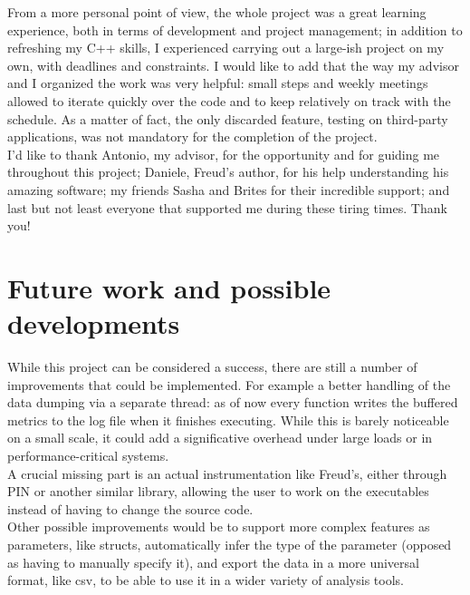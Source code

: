    From a more personal point of view, the whole project was a great learning experience, both
    in terms of development and project management; in addition to refreshing my C++ skills, I
    experienced carrying out a large-ish project on my own, with deadlines and constraints.
    I would like to add that the way my advisor and I organized the work was very helpful: small
    steps and weekly meetings allowed to iterate quickly over the code and to keep 
    relatively on track with the schedule. As a matter of fact, the only discarded feature,
    testing on third-party applications, was not mandatory for the completion of the project.\\

    I'd like to thank Antonio, my advisor, for the opportunity and for guiding me throughout
    this project; Daniele, Freud's author, for his help understanding his amazing software;
    my friends Sasha and Brites for their incredible support;
    and last but not least everyone that supported me during these tiring times. Thank you!


	\section{Future work and possible developments}

        While this project can be considered a success, there are still a number of improvements
        that could be implemented. For example a better handling of the data dumping via a separate thread:
        as of now every function writes the buffered metrics to the log file when it finishes executing. While this
        is barely noticeable on a small scale, it could add a significative overhead under large loads
        or in performance-critical systems.\\

        A crucial missing part is an actual instrumentation like Freud's, either through PIN or another
        similar library, allowing the user to work on the executables instead of having to change the source code.\\

        Other possible improvements would be to support more complex features as parameters, like structs,
        automatically infer the type of the parameter (opposed as having to manually specify it), and
        export the data in a more universal format, like csv, to be able to use it in a wider variety of
        analysis tools.

